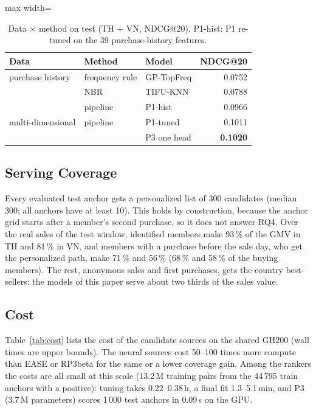 \documentclass{ieeeaccess}
\begin{document}
\begin{table}[t]
\caption{Data $\times$ method on test (TH + VN, NDCG@20). P1-hist: P1 re-tuned on the 39 purchase-history features.}
\label{tab:hist}
\setlength{\tabcolsep}{3pt}
\centering
\begin{adjustbox}{max width=\columnwidth}
\begin{tabular}{lllr}
\toprule
Data & Method & Model & NDCG@20 \\
\midrule
purchase history & frequency rule & GP-TopFreq & 0.0752 \\
                 & NBR            & TIFU-KNN   & 0.0788 \\
                 & pipeline       & P1-hist    & 0.0966 \\
\midrule
multi-dimensional & pipeline      & P1-tuned    & 0.1011 \\
                  &               & P3 one head & \textbf{0.1020} \\
\bottomrule
\end{tabular}
\end{adjustbox}
\end{table}

\subsection{Serving Coverage}
Every evaluated test anchor gets a personalized list of 300 candidates (median 300; all anchors have at least 10). This holds by
construction, because the anchor grid starts after a member's second purchase, so it does not answer RQ4. Over the real sales of the
test window, identified members make 93\,\% of the GMV in TH and 81\,\% in VN, and members with a purchase before the sale day, who
get the personalized path, make 71\,\% and 56\,\% (68\,\% and 58\,\% of the buying members). The rest, anonymous sales and first
purchases, gets the country best-sellers: the models of this paper serve about two thirds of the sales value.

\subsection{Cost}
Table~\ref{tab:cost} lists the cost of the candidate sources on the shared GH200 (wall times are upper bounds). The neural sources cost
50--100 times more compute than EASE or RP3beta for the same or a lower coverage gain. Among the rankers the costs are all small at this
scale (13.2\,M training pairs from the 44\,795 train anchors with a positive): tuning takes 0.22--0.38\,h, a final fit 1.3--5.1\,min, and P3 (3.7\,M
parameters) scores 1\,000 test anchors in 0.09\,s on the GPU.
\end{document}
